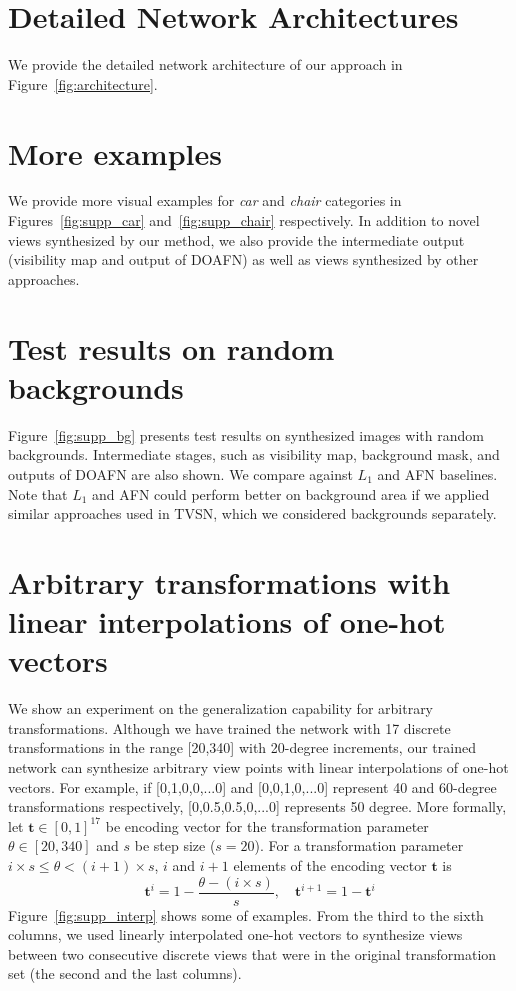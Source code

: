 \documentclass[10pt,twocolumn,letterpaper]{article}
\begin{document}
\section{Detailed Network Architectures}
We provide the detailed network architecture of our approach in Figure~\ref{fig:architecture}.

\section{More examples}
We provide more visual examples for \emph{car} and \emph{chair} categories in Figures~\ref{fig:supp_car} and~\ref{fig:supp_chair} respectively. In addition to novel views synthesized by our method, we also provide the intermediate output (visibility map and output of DOAFN) as well as views synthesized by other approaches.

\section{Test results on random backgrounds}
Figure~\ref{fig:supp_bg} presents test results on synthesized images with random backgrounds. Intermediate stages, such as visibility map, background mask, and outputs of DOAFN are also shown. We compare against $L_1$ and AFN baselines. Note that $L_1$ and AFN could perform better on background area if we applied similar approaches used in TVSN, which we considered backgrounds separately.

\section{Arbitrary transformations with linear interpolations of one-hot vectors}
We show an experiment on the generalization capability for arbitrary transformations. Although we have trained the network with 17 discrete transformations in the range [20,340] with 20-degree increments, our trained network can synthesize arbitrary view points with linear interpolations of one-hot vectors. For example, if [0,1,0,0,...0] and [0,0,1,0,...0] represent 40 and 60-degree transformations respectively, [0,0.5,0.5,0,...0] represents 50 degree. More formally, let $\mathbf{t} \in [0,1]^{17}$ be encoding vector for the transformation parameter $\theta \in [20,340]$ and $s$ be step size ($s = 20$). For a transformation parameter $i \times s \leq \theta < (i+1) \times s$, $i$ and $i+1$ elements of the encoding vector $\mathbf{t}$ is
\begin{equation}
\mathbf{t}^i = 1 - \frac{\theta - (i \times s)}{s}, \quad \mathbf{t}^{i+1} = 1 - \mathbf{t}^i
\end{equation}
Figure~\ref{fig:supp_interp} shows some of examples. From the third to the sixth columns, we used linearly interpolated one-hot vectors to synthesize views between two consecutive discrete views that were in the original transformation set (the second and the last columns).
\end{document}
